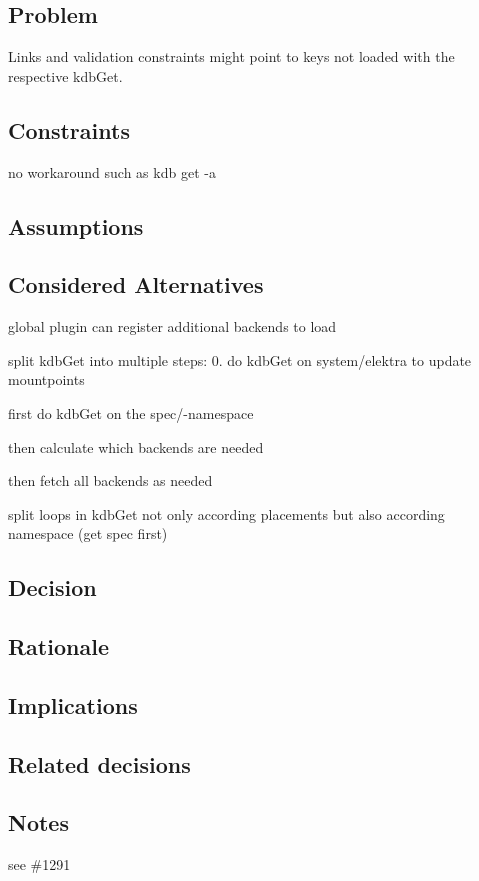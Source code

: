 \subsection*{Problem}

Links and validation constraints might point to keys not loaded with the respective {\ttfamily kdb\+Get}.

\subsection*{Constraints}


\begin{DoxyItemize}
\item no workaround such as {\ttfamily kdb get -\/a}
\end{DoxyItemize}

\subsection*{Assumptions}

\subsection*{Considered Alternatives}


\begin{DoxyItemize}
\item global plugin can register additional backends to load
\item split {\ttfamily kdb\+Get} into multiple steps\+: 0. do {\ttfamily kdb\+Get} on {\ttfamily system/elektra} to update mountpoints
\begin{DoxyEnumerate}
\item first do {\ttfamily kdb\+Get} on the {\ttfamily spec/}-\/namespace
\item then calculate which backends are needed
\item then fetch all backends as needed
\end{DoxyEnumerate}
\item split loops in {\ttfamily kdb\+Get} not only according placements but also according namespace (get spec first)
\end{DoxyItemize}

\subsection*{Decision}

\subsection*{Rationale}

\subsection*{Implications}

\subsection*{Related decisions}

\subsection*{Notes}

see \#1291 